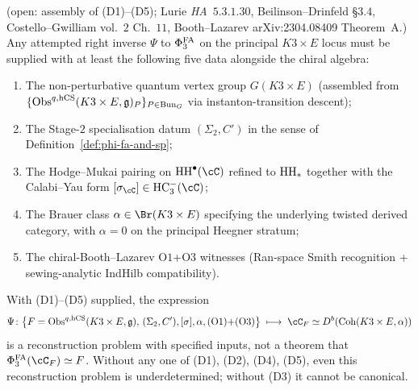 \begin{theorem}
\label{thm:agent08-minimal-additional-data}
\ClaimStatusConditional{} \textup{(open: assembly of (D1)--(D5);
Lurie \emph{HA}~$5.3.1.30$, Beilinson--Drinfeld
\cite{BeilinsonDrinfeld2004} \S$3.4$, Costello--Gwilliam
\cite{CostelloGwilliam2017} vol.~$2$ Ch.~$11$, Booth--Lazarev
arXiv:2304.08409 Theorem~A.)} Any attempted right inverse $\Psi$ to
$\Phi^{\mathrm{FA}}_3$ on the principal $K3\times E$ locus must be supplied with at
least the following five data alongside the chiral algebra:
\begin{enumerate}[label=\textup{(D\arabic*)}]
 \item The non-perturbative quantum vertex group $G(K3\times E)$
 \textup{(}assembled from
 $\{\mathrm{Obs}^{q,\mathrm{hCS}}(K3\times E,\mathfrak{g})_P\}_{P\in\mathrm{Bun}_G}$ via
 instanton-transition descent\textup{);}
 \item The Stage-$2$ specialisation datum $(\Sigma_2,C')$ in the sense
 of Definition~\ref{def:phi-fa-and-sp};
 \item The Hodge--Mukai pairing on $\HH^\bullet(\cC)$ refined to
 $\mathrm{HH}_*$ together with the Calabi--Yau form
 $[\sigma_\cC]\in\HC^-_3(\cC)$;
 \item The Brauer class
 $\alpha\in\Br(K3\times E)$ specifying the underlying twisted derived
 category, with $\alpha=0$ on the principal Heegner stratum;
 \item The chiral-Booth--Lazarev O$1$+O$3$ witnesses (Ran-space Smith
 recognition + sewing-analytic IndHilb compatibility).
\end{enumerate}
With \textup{(D1)--(D5)} supplied, the expression
\[
\Psi \colon
\bigl\{F = \Obs^{q,\hCS}(K3\times E,\frakg),\,(\Sigma_2,C'),
[\sigma],\alpha,\textup{(O1)+(O3)}\bigr\}
\;\longmapsto\;
\cC_F \simeq D^b(\Coh(K3\times E,\alpha))
\]
is a reconstruction problem with specified inputs, not a theorem that
$\PhiFA_3(\cC_F)\simeq F$. Without any one of \textup{(D1)},
\textup{(D2)}, \textup{(D4)}, \textup{(D5)}, even this reconstruction
problem is underdetermined; without \textup{(D3)} it cannot be
canonical.
\end{theorem}

